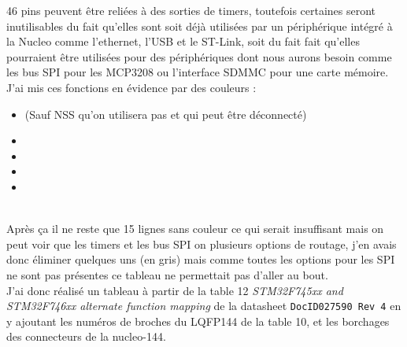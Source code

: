 46 pins peuvent être reliées à des sorties de timers, toutefois
certaines seront inutilisables du fait qu'elles sont soit déjà utilisées
par un périphérique intégré à la Nucleo comme l'ethernet, l'USB et le
ST-Link, soit du fait fait qu'elles pourraient être utilisées pour des
périphériques dont nous aurons besoin comme les bus SPI pour les MCP3208
ou l'interface SDMMC pour une carte mémoire.\\

J'ai mis ces fonctions en évidence par des couleurs :
\begin{itemize}
    \item {} (Sauf NSS qu'on utilisera pas et qui peut être
                    déconnecté)
    \item {}
    \item {}
    \item {}
    \item {}
\end{itemize}
~\\

Après ça il ne reste que 15 lignes sans couleur ce qui serait
insuffisant mais on peut voir que les timers et les bus SPI on plusieurs
options de routage, j'en avais donc éliminer quelques uns (en gris) mais
comme toutes les options pour les SPI ne sont pas présentes ce tableau
ne permettait pas d'aller au bout.\\

J'ai donc réalisé un tableau à partir de la table 12 \textit{STM32F745xx
and STM32F746xx alternate function mapping} de la datasheet
\texttt{DocID027590 Rev 4} en y ajoutant les numéros de broches du
LQFP144 de la table 10, et les borchages des connecteurs de la
nucleo-144.\\

